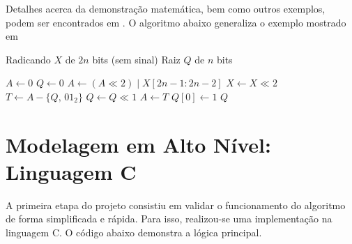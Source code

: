 \documentclass[conference]{IEEEtran}
\begin{document}
Detalhes acerca da demonstração matemática, bem como outros exemplos, podem ser encontrados em \cite{wiki_sqrt}. O algoritmo abaixo generaliza o exemplo mostrado em \cite{projectf_sqrt}
\begin{algorithm}[htbp]
\caption{Raiz quadrada inteira binária em ponto fixo}
\label{alg:sqrt-registradores}
\begin{algorithmic}[1]
\Require Radicando $X$ de $2n$ bits (sem sinal)
\Ensure Raiz $Q$ de $n$ bits

\State $A \gets 0$ 
\State $Q \gets 0$ 
    \State $A \gets (A \ll 2) \mid X[2n\!-\!1\!:\!2n\!-\!2]$ 
    \State $X \gets X \ll 2$
    \State $T \gets A - \{Q,\,01_2\}$ 
    \State $Q \gets Q \ll 1$
        \State $A \gets T$
        \State $Q[0] \gets 1$
    \EndIf
\EndFor
\State \Return $Q$
\end{algorithmic}
\end{algorithm}

\newpage
\section{Modelagem em Alto Nível: Linguagem C}
A primeira etapa do projeto consistiu em validar o funcionamento do algoritmo de forma simplificada e rápida. Para isso, realizou-se uma implementação na linguagem C. O código abaixo demonstra a lógica principal.
\end{document}
